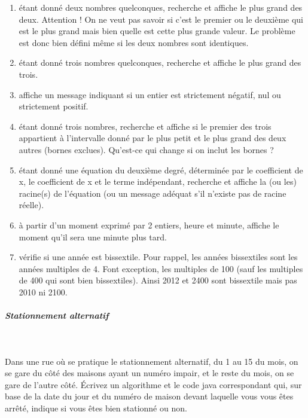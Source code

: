 \documentclass[11pt,a4paper]{article}
\begin{document}
					\begin{enumerate}
				
			\item \'etant donn\'e deux nombres quelconques, recherche et affiche le plus
              grand des deux. Attention ! On ne veut pas savoir si c'est le premier ou le deuxi\`eme qui est
              le plus grand mais bien quelle est cette plus grande valeur. Le probl\`eme est donc bien d\'efini
              m\^eme si les deux nombres sont identiques.
            
			\item \'etant donn\'e trois nombres quelconques, recherche et affiche le plus grand des trois.
			\item affiche un message indiquant si un entier est strictement n\'egatif, nul ou strictement positif.
			\item \'etant donn\'e trois nombres, recherche et affiche si le premier des 
            trois appartient \`a l'intervalle donn\'e par le plus petit et le plus grand des deux autres (bornes exclues). 
            Qu'est-ce qui change si on inclut les bornes ?
			\item \'etant donn\'e une \'equation du deuxi\`eme degr\'e, d\'etermin\'ee par le coefficient de x\texttwosuperior  , le coefficient de x et le terme ind\'ependant, 
            recherche et affiche la (ou les) racine(s) de l'\'equation (ou un message ad\'equat s'il n'existe pas de racine r\'eelle).
			\item \`a partir d'un moment exprim\'e par 2 entiers, heure et minute, affiche le moment qu'il sera une minute plus tard.
			\item v\'erifie si une ann\'ee est bissextile. Pour rappel, les ann\'ees bissextiles sont les ann\'ees multiples de 4.
             Font exception, les multiples de 100 (sauf les multiples de 400 qui sont bien bissextiles). Ainsi 2012 et 2400 sont bissextile mais pas 2010 ni 2100.
					\end{enumerate}
				
            \par
        
			
		\subparagraph{Stationnement alternatif} 
		
					\textcolor{white}{.} \par
				
          Dans une rue o\`u se pratique le stationnement alternatif, du 1 au 15 du mois, on se gare du c\^ot\'e des maisons ayant un num\'ero impair, 
          et le reste du mois, on se gare de l'autre c\^ot\'e.
          \'Ecrivez un algorithme et le code java correspondant qui, sur base de la date du jour et du num\'ero de maison devant laquelle
          vous vous \^etes arr\^et\'e, indique si vous \^etes bien stationn\'e ou non.
        
\end{document}
